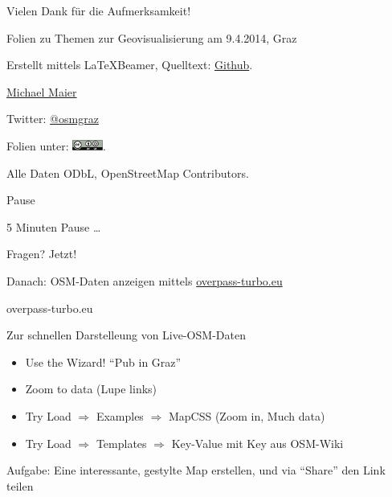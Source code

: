 \documentclass{beamer}
\begin{document}
\begin{frame}{Vielen Dank für die Aufmerksamkeit!}

  Folien zu Themen zur Geovisualisierung am 9.4.2014, Graz
\vspace{1cm}

Erstellt mittels \LaTeX Beamer, Quelltext: \href{https://github.com/species/vortrag-osm-kfu-geovis}{Github}.
\vspace{1cm}

\href{mailto:michael.maier@student.tugraz.at}{Michael Maier}

Twitter: \href{https://twitter.com/osmgraz}{@osmgraz}
\vspace{1cm}

Folien unter: \includegraphics[width=1cm]{cc-by-sa.pdf}. 

Alle Daten ODbL, OpenStreetMap Contributors.

\end{frame}

\begin{frame}{Pause}

5 Minuten Pause \dots

\vspace{1.5cm}

Fragen? Jetzt!

\vspace{1.5cm}

Danach: OSM-Daten anzeigen mittels \href{http://overpass-turbo.eu}{overpass-turbo.eu}

\end{frame}

\begin{frame}{overpass-turbo.eu}

  Zur schnellen Darstelleung von Live-OSM-Daten

\begin{itemize}
        \item Use the Wizard! "`Pub in Graz"'
        \item Zoom to data (Lupe links)
        \item Try Load $\Rightarrow$ Examples $\Rightarrow$ MapCSS (Zoom in, Much data)
        \item Try Load $\Rightarrow$ Templates $\Rightarrow$ Key-Value mit Key aus OSM-Wiki
\end{itemize}

\pause
Aufgabe: Eine interessante, gestylte Map erstellen, und via "`Share"' den Link teilen

\end{frame}
\end{document}
